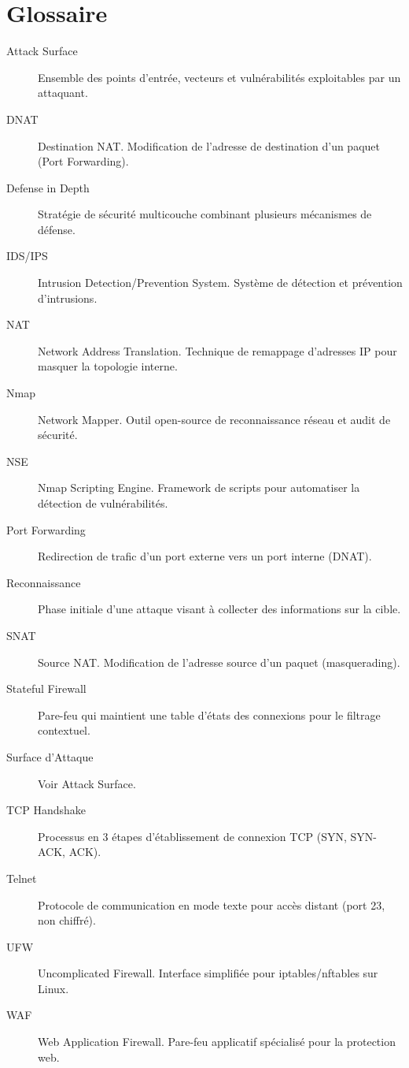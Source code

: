 \documentclass[12pt,a4paper,openany]{report}
\begin{document}
		\section{Glossaire}
	\begin{description}
		\item[Attack Surface] Ensemble des points d'entrée, vecteurs et vulnérabilités exploitables par un attaquant.
		
		\item[DNAT] Destination NAT. Modification de l'adresse de destination d'un paquet (Port Forwarding).
		
		\item[Defense in Depth] Stratégie de sécurité multicouche combinant plusieurs mécanismes de défense.
		
		\item[IDS/IPS] Intrusion Detection/Prevention System. Système de détection et prévention d'intrusions.
		
		\item[NAT] Network Address Translation. Technique de remappage d'adresses IP pour masquer la topologie interne.
		
		\item[Nmap] Network Mapper. Outil open-source de reconnaissance réseau et audit de sécurité.
		
		\item[NSE] Nmap Scripting Engine. Framework de scripts pour automatiser la détection de vulnérabilités.
		
		\item[Port Forwarding] Redirection de trafic d'un port externe vers un port interne (DNAT).
		
		\item[Reconnaissance] Phase initiale d'une attaque visant à collecter des informations sur la cible.
		
		\item[SNAT] Source NAT. Modification de l'adresse source d'un paquet (masquerading).
		
		\item[Stateful Firewall] Pare-feu qui maintient une table d'états des connexions pour le filtrage contextuel.
		
		\item[Surface d'Attaque] Voir Attack Surface.
		
		\item[TCP Handshake] Processus en 3 étapes d'établissement de connexion TCP (SYN, SYN-ACK, ACK).
		
		\item[Telnet] Protocole de communication en mode texte pour accès distant (port 23, non chiffré).
		
		\item[UFW] Uncomplicated Firewall. Interface simplifiée pour iptables/nftables sur Linux.
		
		\item[WAF] Web Application Firewall. Pare-feu applicatif spécialisé pour la protection web.
	\end{description}
	
\end{document}
